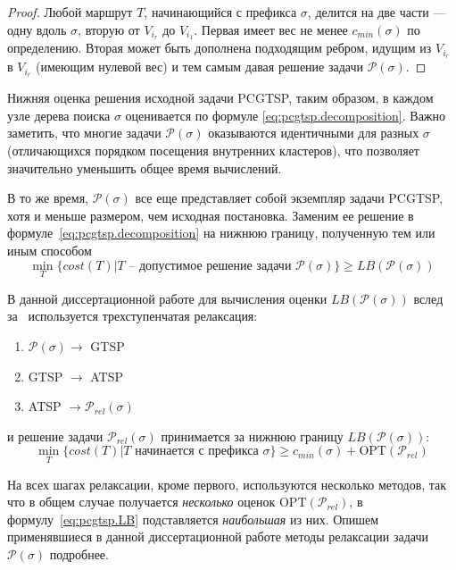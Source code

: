 \begin{proof}
  Любой маршрут $T$,
  начинающийся с префикса $\sigma$,
  делится на две части ---
  одну вдоль $\sigma$,
  вторую от $V_{i_r}$ до ${V_{i_1}}$.
  Первая имеет вес не менее $c_{min}(\sigma)$
  по определению.
  Вторая может быть дополнена подходящим ребром,
  идущим из $V_{i_r}$ в ${V_{i_r}}$
  (имеющим нулевой вес)
  и тем самым давая решение задачи
  $\mathcal P(\sigma)$.
\end{proof}

Нижняя оценка решения исходной задачи PCGTSP,
таким образом,
в каждом узле дерева поиска
$\sigma$
оценивается по формуле \eqref{eq:pcgtsp.decomposition}.
Важно заметить,
что многие задачи $\mathcal  P(\sigma)$
оказываются идентичными для разных $\sigma$
(отличающихся порядком посещения внутренних кластеров),
что позволяет значительно уменьшить общее время вычислений.

В то же время,
$\mathcal P(\sigma)$
все еще представляет собой экземпляр
задачи PCGTSP,
хотя и меньше размером,
чем исходная постановка.
Заменим ее решение в формуле~\eqref{eq:pcgtsp.decomposition}
на нижнюю границу,
полученную тем или иным способом
$$
\min_{T}\{cost(T)| T \text{ -- допустимое решение задачи } \mathcal P(\sigma)\}
\geqslant LB(\mathcal P(\sigma))
$$

В данной диссертационной работе для вычисления оценки
$LB(\mathcal P(\sigma))$
вслед за~\cite{SALMAN2020163}
используется трехступенчатая релаксация:
\begin{enumerate}
  \item $\mathcal P(\sigma) \to$ GTSP
  \item GTSP $\to$ ATSP
  \item ATSP $\to \mathcal P_{rel}(\sigma)$
\end{enumerate}
и решение задачи $\mathcal P_{rel}(\sigma)$
принимается за нижнюю границу
$LB(\mathcal P(\sigma))$:
\begin{equation}
  \label{eq:pcgtsp.LB}
  \min_T \{cost(T)| T \text{ начинается с префикса } \sigma\}
  \geqslant
  c_{min}(\sigma) + \mathrm{OPT}(\mathcal P_{rel})
\end{equation}

На всех шагах релаксации,
кроме первого,
используются несколько методов,
так что в общем случае получается \textit{несколько}
оценок
$\mathrm{OPT}(\mathcal P_{rel})$,
в формулу~\eqref{eq:pcgtsp.LB}
подставляется \textit{наибольшая} из них.
Опишем применявшиеся в данной диссертационной работе
методы релаксации задачи
$\mathcal P(\sigma)$
подробнее.

